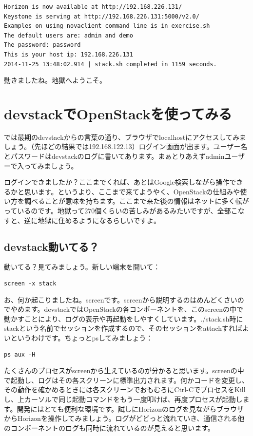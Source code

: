 \documentclass[8pt,b5paper,tombo,openany]{jsbook}
\begin{document}
\begin{lstlisting}
Horizon is now available at http://192.168.226.131/
Keystone is serving at http://192.168.226.131:5000/v2.0/
Examples on using novaclient command line is in exercise.sh
The default users are: admin and demo
The password: password
This is your host ip: 192.168.226.131
2014-11-25 13:48:02.914 | stack.sh completed in 1159 seconds.
\end{lstlisting}

動きましたね。地獄へようこそ。

\section{devstackでOpenStackを使ってみる}

では最期のdevstackからの言葉の通り、ブラウザでlocalhostにアクセスしてみましょう。（先ほどの結果では192.168.122.13）ログイン画面が出ます。ユーザー名とパスワードはdevstackのログに書いてあります。まぁとりあえずadminユーザーで入ってみましょう。

ログインできましたか？ここまでくれば、あとはGoogle検索しながら操作できるかと思います。というより、ここまで来てようやく、OpenStackの仕組みや使い方を調べることが意味を持ちます。ここまで来た後の情報はネットに多く転がっているのです。地獄って270個くらいの苦しみがあるみたいですが、全部こなすと、逆に地獄に住めるようになるらしいですよ。

\subsection{devstack動いてる？}

動いてる？見てみましょう。新しい端末を開いて：

\begin{lstlisting}
screen -x stack
\end{lstlisting}

お、何か起こりましたね。screenです。screenから説明するのはめんどくさいのでやめます。devstackではOpenStackの各コンポーネントを、このscreenの中で動かすことにより、ログの表示や再起動をしやすくしています。./stack.sh時にstackという名前でセッションを作成するので、そのセッションをattachすればよいというわけです。ちょっとpsしてみましょう：

\begin{lstlisting}
ps aux -H
\end{lstlisting}

たくさんのプロセスがscreenから生えているのが分かると思います。screenの中で起動し、ログはその各スクリーンに標準出力されます。何かコードを変更し、その動作を確かめるときには各スクリーンでおもむろにCtrl-CでプロセスをKillし、上カーソルで同じ起動コマンドをもう一度叩けば、再度プロセスが起動します。開発にはとても便利な環境です。試しにHorizonのログを見ながらブラウザからHorizonを操作してみましょう。ログがどどっと流れていき、通信される他のコンポーネントのログも同時に流れているのが見えると思います。
\end{document}
